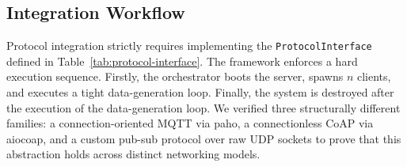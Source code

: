 \documentclass[jsan,article,submit,moreauthors,pdftex]{Definitions/mdpi}
\begin{document}
\subsection{Integration Workflow}
\label{sub:integration-workflow}
Protocol integration strictly requires implementing the \texttt{ProtocolInterface} defined in Table~\ref{tab:protocol-interface}. The framework enforces a hard execution sequence. Firstly, the orchestrator boots the server, spawns $n$ clients, and executes a tight data-generation loop. Finally, the system is destroyed after the execution of the data-generation loop. We verified three structurally different families: a connection-oriented MQTT via paho, a connectionless CoAP  via aiocoap, and a custom pub-sub protocol over raw UDP sockets to prove that this abstraction holds across distinct networking models.
\end{document}
